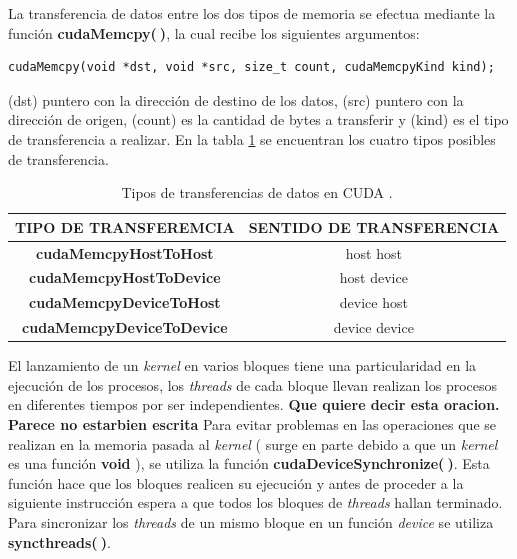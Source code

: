 La transferencia de datos entre los dos tipos de memoria se efectua mediante la función \textbf{cudaMemcpy($\>$)}, la cual recibe los siguientes argumentos:
{\footnotesize
\begin{frame}{}
	\begin{lstlisting}
cudaMemcpy(void *dst, void *src, size_t count, cudaMemcpyKind kind);
	\end{lstlisting}
	
\end{frame}
}
(dst) puntero con la dirección de destino de los datos, (src) puntero con la dirección de origen, (count) es la cantidad de bytes a transferir y (kind) es el tipo de transferencia a realizar\cite{zone2020cuda}. En la tabla \ref{tab:cudamemcy} se encuentran los cuatro tipos posibles de transferencia.

\begin{table}[h!]
	\centering
	\begin{tabular}{|c|c|}
		\hline
		\multicolumn{1}{|l|}{TIPO DE TRANSFEREMCIA} & \multicolumn{1}{l|}{SENTIDO DE TRANSFERENCIA} \\ \hline
		\textbf{cudaMemcpyHostToHost}               & host host                                     \\ \hline
		\textbf{cudaMemcpyHostToDevice}             & host device                                   \\ \hline
		\textbf{cudaMemcpyDeviceToHost}             & device host                                   \\ \hline
		\textbf{cudaMemcpyDeviceToDevice}           & device device                                 \\ \hline
	\end{tabular}
	\caption{Tipos de transferencias de datos en CUDA \cite{represa2016introduccion}.}
	\label{tab:cudamemcy}
\end{table}

El lanzamiento de un \textit{kernel} en varios bloques tiene una particularidad en la ejecución de los procesos, los \textit{threads} de cada bloque llevan realizan los procesos en diferentes tiempos por ser independientes. \textbf{Que quiere decir esta oracion. Parece no estarbien escrita} Para evitar problemas en las operaciones que se realizan en la memoria pasada al \textit{kernel} ( surge en parte debido a que un \textit{kernel} es una función \textbf{void} ), se utiliza la función \textbf{cudaDeviceSynchronize($\>$)}. Esta función hace que los bloques realicen su ejecución y antes de proceder a la siguiente instrucción espera a que todos los bloques de \textit{threads} hallan terminado. Para sincronizar los \textit{threads} de un mismo bloque en un función \textit{device} se utiliza \textbf{syncthreads($\>$)}.


